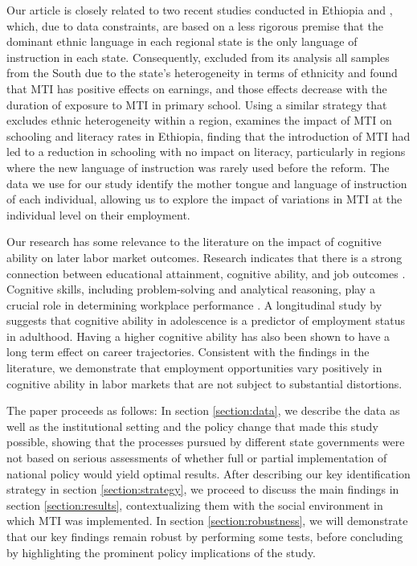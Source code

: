 Our article is closely related to two recent studies conducted in Ethiopia \cite{seid_mother-tongue_2022} and \cite{chicoine_schooling_2019}, which, due to data constraints, are based on a less rigorous premise that the dominant ethnic language in each regional state is the only language of instruction in each state. Consequently, \cite{seid_mother-tongue_2022} excluded from its analysis all samples from the South due to the state's heterogeneity in terms of ethnicity and found that MTI has positive effects on earnings, and those effects decrease with the duration of exposure to MTI in primary school. Using a similar strategy that excludes ethnic heterogeneity within a region, \citep{chicoine_schooling_2019} examines the impact of MTI on schooling and literacy rates in Ethiopia, finding that the introduction of MTI had led to a reduction in schooling with no impact on literacy, particularly in regions where the new language of instruction was rarely used before the reform.  The data we use for our study identify the mother tongue and language of instruction of each individual, allowing us to explore the impact of variations in MTI at the individual level on their employment.


Our research has some relevance to the literature on the impact of cognitive ability on later labor market outcomes. Research indicates that there is a strong connection between educational attainment, cognitive ability, and job outcomes \citep{bowles_determinants_2001,cunha_technology_2007,heckman_fostering_2013,keuschnigg_plateauing_2023}. Cognitive skills, including problem-solving and analytical reasoning, play a crucial role in determining workplace performance \citep{deming_growing_2017,almlund_personality_2011,schmidt_general_2004}. A longitudinal study by \cite{moffitt_gradient_2011} suggests that cognitive ability in adolescence is a predictor of employment status in adulthood. Having a higher cognitive ability has also been shown to have a long term effect on career trajectories. Consistent with the findings in the literature, we demonstrate that employment opportunities vary positively in cognitive ability in labor markets that are not subject to substantial distortions. 


The paper proceeds as follows: In section \ref{section:data}, we describe the data as well as the institutional setting and the policy change that made this study possible, showing that the processes pursued by different state governments were not based on serious assessments of whether full or partial implementation of national policy would yield optimal results. After describing our key identification strategy in section \ref{section:strategy}, we proceed to discuss the main findings in section \ref{section:results}, contextualizing them with the social environment in which MTI was implemented. In section \ref{section:robustness}, we will demonstrate that our key findings remain robust by performing some tests, before concluding by highlighting the prominent policy implications of the study.
